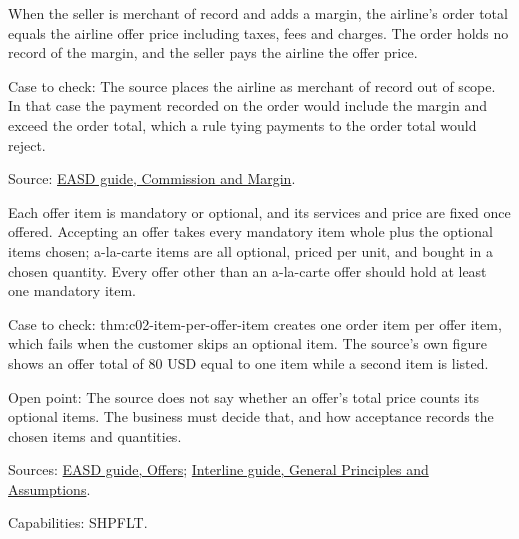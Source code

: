 \begin{theorem}
  \label{thm:offers-margin-outside-order}
  When the seller is merchant of record and adds a margin, the airline's
  order total equals the airline offer price including taxes, fees and
  charges. The order holds no record of the margin, and the seller pays the
  airline the offer price.

  Case to check: The source places the airline as merchant of record out of
  scope. In that case the payment recorded on the order would include the
  margin and exceed the order total, which a rule tying payments to the
  order total would reject.

  Source: \href{https://standards.atlassian.net/wiki/spaces/EASD/pages/574849050/Commission+and+Margin}{EASD guide, Commission and Margin}.
\end{theorem}

\begin{definition}
  \label{def:offers-mandatory-optional-items}
  \notready
  Each offer item is mandatory or optional, and its services and price are
  fixed once offered. Accepting an offer takes every mandatory item whole
  plus the optional items chosen; a-la-carte items are all optional, priced
  per unit, and bought in a chosen quantity. Every offer other than an
  a-la-carte offer should hold at least one mandatory item.

  Case to check: thm:c02-item-per-offer-item creates one order item per
  offer item, which fails when the customer skips an optional item. The
  source's own figure shows an offer total of 80 USD equal to one item while
  a second item is listed.

  Open point: The source does not say whether an offer's total price counts
  its optional items. The business must decide that, and how acceptance
  records the chosen items and quantities.

  Sources: \href{https://standards.atlassian.net/wiki/spaces/EASD/pages/600637464/Offers}{EASD guide, Offers};
  \href{https://standards.atlassian.net/wiki/spaces/SRSIA/pages/574619905/General+Principles+and+Assumptions}{Interline guide, General Principles and Assumptions}.

  Capabilities: SHPFLT.
\end{definition}

